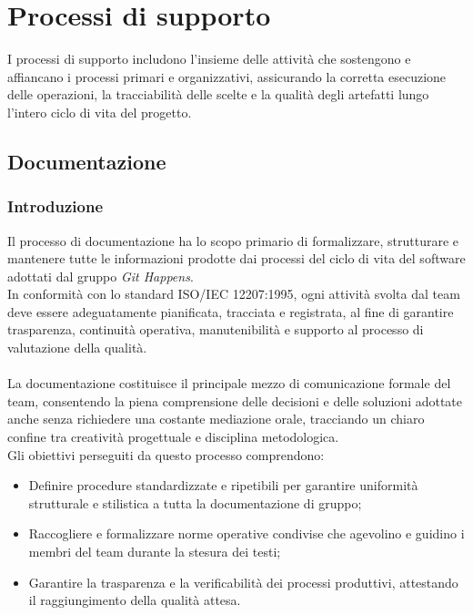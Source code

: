 \section{Processi di supporto}
I processi di supporto includono l'insieme delle attività che sostengono e affiancano i processi primari e organizzativi, assicurando la corretta esecuzione delle operazioni, la tracciabilità delle scelte e la qualità degli artefatti lungo l'intero ciclo di vita del progetto.

\subsection{Documentazione}

\subsubsection{Introduzione}
Il processo di documentazione ha lo scopo primario di formalizzare, strutturare e mantenere tutte le informazioni prodotte dai processi del ciclo di vita del software adottati dal gruppo \textit{Git Happens}. \\
In conformità con lo standard ISO/IEC 12207:1995, ogni attività svolta dal team deve essere adeguatamente pianificata, tracciata e registrata, al fine di garantire trasparenza, continuità operativa, manutenibilità e supporto al processo di valutazione della qualità. \\
\\
\noindent La documentazione costituisce il principale mezzo di comunicazione formale del team, consentendo la piena comprensione delle decisioni e delle soluzioni adottate anche senza richiedere una costante mediazione orale, tracciando un chiaro confine tra creatività progettuale e disciplina metodologica. \\
Gli obiettivi perseguiti da questo processo comprendono:
\begin{itemize}
    \item Definire procedure standardizzate e ripetibili per garantire uniformità strutturale e stilistica a tutta la documentazione di gruppo;
    \item Raccogliere e formalizzare norme operative condivise che agevolino e guidino i membri del team durante la stesura dei testi;
    \item Garantire la trasparenza e la verificabilità dei processi produttivi, attestando il raggiungimento della qualità attesa.
\end{itemize}
